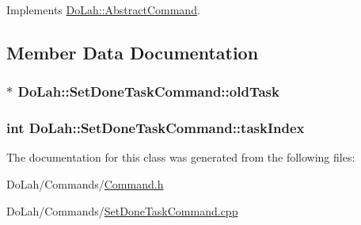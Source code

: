 Implements \hyperlink{class_do_lah_1_1_abstract_command_a9760328f2d6b85d8edc803a97a29dfc0}{Do\+Lah\+::\+Abstract\+Command}.



\subsection{Member Data Documentation}
\hypertarget{class_do_lah_1_1_set_done_task_command_a986b196327bc85c2a844d6d15112969d}{}
\subsubsection[{old\+Task}]{$\ast$ Do\+Lah\+::\+Set\+Done\+Task\+Command\+::old\+Task\hspace{0.3cm}{\ttfamily [private]}}\label{class_do_lah_1_1_set_done_task_command_a986b196327bc85c2a844d6d15112969d}
\hypertarget{class_do_lah_1_1_set_done_task_command_a0c82110ae249083704566e4e7201747f}{}
\subsubsection[{task\+Index}]{\setlength{\rightskip}{0pt plus 5cm}int Do\+Lah\+::\+Set\+Done\+Task\+Command\+::task\+Index\hspace{0.3cm}{\ttfamily [private]}}\label{class_do_lah_1_1_set_done_task_command_a0c82110ae249083704566e4e7201747f}


The documentation for this class was generated from the following files\+:\begin{DoxyCompactItemize}
\item 
Do\+Lah/\+Commands/\hyperlink{_command_8h}{Command.\+h}\item 
Do\+Lah/\+Commands/\hyperlink{_set_done_task_command_8cpp}{Set\+Done\+Task\+Command.\+cpp}\end{DoxyCompactItemize}
